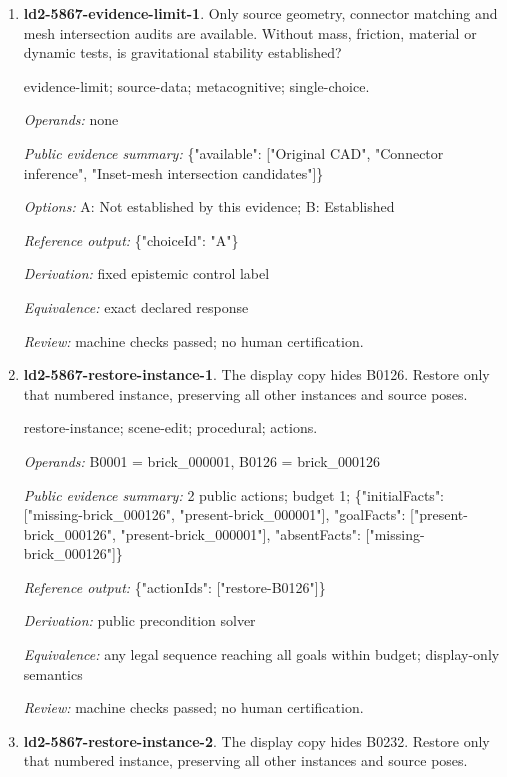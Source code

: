 \begin{enumerate}
\item \textbf{ld2-5867-evidence-limit-1}. Only source geometry, connector matching and mesh intersection audits are available. Without mass, friction, material or dynamic tests, is gravitational stability established?
\par{\small evidence-limit; source-data; metacognitive; single-choice.\par\textit{Operands:} none\par\textit{Public evidence summary:} \{"available": ["Original CAD", "Connector inference", "Inset-mesh intersection candidates"]\}\par\textit{Options:} A: Not established by this evidence; B: Established\par\textit{Reference output:} \{"choiceId": "A"\}\par\textit{Derivation:} fixed epistemic control label\par\textit{Equivalence:} exact declared response\par\textit{Review:} machine checks passed; no human certification.}
\item \textbf{ld2-5867-restore-instance-1}. The display copy hides B0126. Restore only that numbered instance, preserving all other instances and source poses.
\par{\small restore-instance; scene-edit; procedural; actions.\par\textit{Operands:} B0001 = brick\_000001, B0126 = brick\_000126\par\textit{Public evidence summary:} 2 public actions; budget 1; \{"initialFacts": ["missing-brick\_000126", "present-brick\_000001"], "goalFacts": ["present-brick\_000126", "present-brick\_000001"], "absentFacts": ["missing-brick\_000126"]\}\par\textit{Reference output:} \{"actionIds": ["restore-B0126"]\}\par\textit{Derivation:} public precondition solver\par\textit{Equivalence:} any legal sequence reaching all goals within budget; display-only semantics\par\textit{Review:} machine checks passed; no human certification.}
\item \textbf{ld2-5867-restore-instance-2}. The display copy hides B0232. Restore only that numbered instance, preserving all other instances and source poses.

\end{enumerate}
